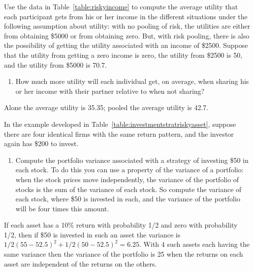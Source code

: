 \begin{enumialphparenastyle}
\begin{ex}\label{ex:ch7ex5}
Use the data in Table~\ref{table:riskyincome} to compute the average utility that each participant gets from his or her income in the different situations under the following assumption about utility: with no pooling of risk, the utilities are either from obtaining \$5000 or from obtaining zero. But, with risk pooling, there is also the possibility of getting the utility associated with an income of \$2500. Suppose that the utility from getting a zero income is zero, the utility from \$2500 is 50, and the utility from \$5000 is 70.7.
\begin{enumerate}
	\item	How much more utility will each individual get, on average, when sharing his or her income with their partner relative to when not sharing?
\end{enumerate}
\begin{sol}
	Alone the average utility is 35.35; pooled the average utility is 42.7.
	
\end{sol}
\end{ex}

\begin{ex}\label{ex:ch7ex6}
In the example developed in Table~\ref{table:investmentstratriskyasset}, suppose there are four identical firms with the same return pattern, and the investor again has \$200 to invest.
\begin{enumerate}
	\item	Compute the portfolio variance associated with a strategy of investing \$50 in each stock. To do this you can use a property of the variance of a portfolio: when the stock prices move independently, the variance of the portfolio of stocks is the sum of the variance of each stock. So compute the variance of each stock, where \$50 is invested in each, and the variance of the portfolio will be four times this amount.
\end{enumerate}
\begin{sol}
	If each asset has a 10\% return with probability 1/2 and zero with probability 1/2, then if \$50 is invested in such an asset the variance is $1/2(55-52.5)^2+1/2(50-52.5)^2=6.25$. With 4 such assets each having the same variance then the variance of the portfolio is 25 when the returns on each asset are independent of the returns on the others.
	
\end{sol}
\end{ex}


\end{enumialphparenastyle}
